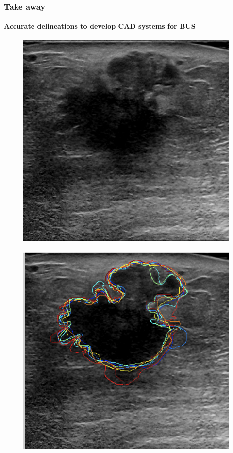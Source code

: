\begin{frame}\frametitle{Take away}
  \framesubtitle{Accurate delineations to develop CAD systems for BUS}
\begin{figure}
\includegraphics[trim=0 6 0 0,clip,height=.5\textheight]{a110105_094.png}~
\includegraphics[trim=6 0 0 0,clip,height=.5\textheight]{segment.png}
\end{figure}
\end{frame}
